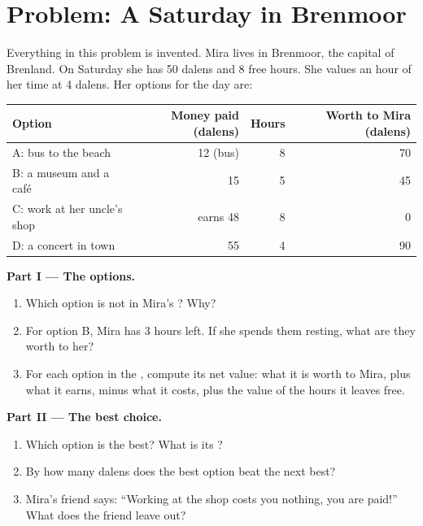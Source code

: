 \section{Problem: A Saturday in Brenmoor}

\begin{problem}
\label{pb:g7:scarcity-and-opportunity-cost:1}
Everything in this problem is invented. Mira lives in Brenmoor, the capital of
Brenland. On Saturday she has 50 dalens and 8 free hours. She values an hour of her
time at 4 dalens. Her options for the day are:
\begin{center}
\begin{tabular}{lrrr}
\toprule
Option & Money paid (dalens) & Hours & Worth to Mira (dalens) \\
\midrule
A: bus to the beach & 12 (bus) & 8 & 70 \\
B: a museum and a café & 15 & 5 & 45 \\
C: work at her uncle's shop & earns 48 & 8 & 0 \\
D: a concert in town & 55 & 4 & 90 \\
\bottomrule
\end{tabular}
\end{center}

\medskip
\noindent\textbf{Part I --- The options.}
\begin{enumerate}
  \item Which option is not in Mira's ? Why?
  \item For option B, Mira has 3 hours left. If she spends them resting, what are they
        worth to her?
  \item For each option in the , compute its net value: what it is worth to
        Mira, plus what it earns, minus what it costs, plus the value of the hours it
        leaves free.
\end{enumerate}

\medskip
\noindent\textbf{Part II --- The best choice.}
\begin{enumerate}[resume]
  \item Which option is the best? What is its ?
  \item By how many dalens does the best option beat the next best?
  \item Mira's friend says: ``Working at the shop costs you nothing, you are paid!''
        What does the friend leave out?
\end{enumerate}


\end{problem}

